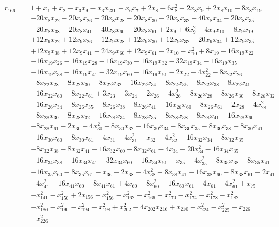 \[\begin{aligned}
r_{166}={}&1+x_{1}+x_{2}-x_{3}x_{9}-x_{3}x_{231}-x_{6}x_{7}+2x_{8}-6x_{8}^{2}+2x_{8}x_{9}+2x_{8}x_{10}-8x_{8}x_{19}
\\ &-20x_{8}x_{22}-20x_{8}x_{26}-20x_{8}x_{28}-20x_{8}x_{30}-20x_{8}x_{32}-40x_{8}x_{34}-20x_{8}x_{35}
\\ &-20x_{8}x_{38}-20x_{8}x_{41}-40x_{8}x_{60}-20x_{8}x_{61}+2x_{9}+6x_{9}^{2}-4x_{9}x_{10}-8x_{9}x_{19}
\\ &+12x_{9}x_{22}+12x_{9}x_{26}+12x_{9}x_{28}+12x_{9}x_{30}+12x_{9}x_{32}+20x_{9}x_{34}+12x_{9}x_{35}
\\ &+12x_{9}x_{38}+12x_{9}x_{41}+24x_{9}x_{60}+12x_{9}x_{61}-2x_{10}-x_{10}^{2}+8x_{19}-16x_{19}x_{22}
\\ &-16x_{19}x_{26}-16x_{19}x_{28}-16x_{19}x_{30}-16x_{19}x_{32}-32x_{19}x_{34}-16x_{19}x_{35}
\\ &-16x_{19}x_{38}-16x_{19}x_{41}-32x_{19}x_{60}-16x_{19}x_{61}-2x_{22}-4x_{22}^{2}-8x_{22}x_{26}
\\ &-8x_{22}x_{28}-8x_{22}x_{30}-8x_{22}x_{32}-16x_{22}x_{34}-8x_{22}x_{35}-8x_{22}x_{38}-8x_{22}x_{41}
\\ &-16x_{22}x_{60}-8x_{22}x_{61}+3x_{23}-3x_{24}-2x_{26}-4x_{26}^{2}-8x_{26}x_{28}-8x_{26}x_{30}-8x_{26}x_{32}
\\ &-16x_{26}x_{34}-8x_{26}x_{35}-8x_{26}x_{38}-8x_{26}x_{41}-16x_{26}x_{60}-8x_{26}x_{61}-2x_{28}-4x_{28}^{2}
\\ &-8x_{28}x_{30}-8x_{28}x_{32}-16x_{28}x_{34}-8x_{28}x_{35}-8x_{28}x_{38}-8x_{28}x_{41}-16x_{28}x_{60}
\\ &-8x_{28}x_{61}-2x_{30}-4x_{30}^{2}-8x_{30}x_{32}-16x_{30}x_{34}-8x_{30}x_{35}-8x_{30}x_{38}-8x_{30}x_{41}
\\ &-16x_{30}x_{60}-8x_{30}x_{61}-4x_{31}-4x_{31}^{2}-x_{32}-4x_{32}^{2}-16x_{32}x_{34}-8x_{32}x_{35}
\\ &-8x_{32}x_{38}-8x_{32}x_{41}-16x_{32}x_{60}-8x_{32}x_{61}-4x_{34}-20x_{34}^{2}-16x_{34}x_{35}
\\ &-16x_{34}x_{38}-16x_{34}x_{41}-32x_{34}x_{60}-16x_{34}x_{61}-x_{35}-4x_{35}^{2}-8x_{35}x_{38}-8x_{35}x_{41}
\\ &-16x_{35}x_{60}-8x_{35}x_{61}-x_{36}-2x_{38}-4x_{38}^{2}-8x_{38}x_{41}-16x_{38}x_{60}-8x_{38}x_{61}-2x_{41}
\\ &-4x_{41}^{2}-16x_{41}x_{60}-8x_{41}x_{61}+4x_{60}-8x_{60}^{2}-16x_{60}x_{61}-4x_{61}-4x_{61}^{2}+x_{75}
\\ &-x_{141}^{2}-x_{150}^{2}+2x_{156}-x_{156}^{2}-x_{162}^{2}-x_{166}^{2}-x_{170}^{2}-x_{174}^{2}-x_{178}^{2}-x_{182}^{2}
\\ &-x_{186}^{2}-x_{190}^{2}-x_{194}^{2}-x_{198}^{2}+x_{202}^{2}-4x_{202}x_{216}+x_{210}-x_{224}^{2}-x_{225}^{2}-x_{226}
\\ &-x_{226}^{2}
\end{aligned}\]
